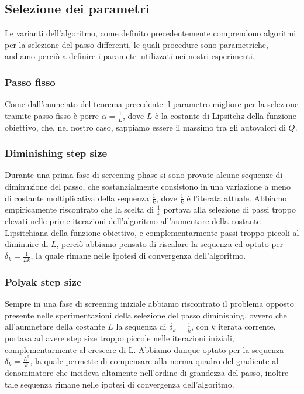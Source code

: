 \documentclass{article}
\begin{document}
\subsection{Selezione dei parametri}
Le varianti dell'algoritmo, come definito precedentemente comprendono algoritmi per la selezione del passo differenti, le quali procedure sono parametriche, andiamo perciò a definire i parametri utilizzati nei nostri esperimenti.
\subsubsection{Passo fisso}
Come dall'enunciato del teorema precedente il parametro migliore per la selezione tramite passo fisso è porre $\alpha = \frac{1}{L}$, dove $L$ è la costante di Lipsitchz della funzione obiettivo, che, nel nostro caso, sappiamo essere il massimo tra gli autovalori di $Q$.
\subsubsection{Diminishing step size}
Durante una prima fase di screening-phase si sono provate alcune sequenze di diminuzione del passo, che sostanzialmente consistono in una variazione a meno di costante moltiplicativa della sequenza $\frac{1}{k}$, dove $\frac{1}{k}$ è l'iterata attuale. Abbiamo empiricamente riscontrato che la scelta di $\frac{1}{k}$ portava alla selezione di passi troppo elevati nelle prime iterazioni dell'algoritmo all'aumentare della costante Lipsitchiana della funzione obiettivo, e complementarmente passi troppo piccoli al diminuire di $L$, perciò abbiamo pensato di riscalare la sequenza ed optato per $\delta_k = \frac{1}{Lk}$, la quale rimane nelle ipotesi di convergenza dell'algoritmo.
\subsubsection{Polyak step size}
Sempre in una fase di screening iniziale abbiamo riscontrato il problema opposto presente nelle sperimentazioni della selezione del passo diminishing, ovvero che all'aumnetare della costante $L$ la sequenza di $\delta_k = \frac{1}{k}$, con $k$ iterata corrente, portava ad avere step size troppo piccole nelle iterazioni iniziali, complementarmente al crescere di L. Abbiamo dunque optato per la sequenza $\delta_k = \frac{L^2}{k}$, la quale permette di compensare alla norma quadro del gradiente al denominatore che incideva altamente nell'ordine di grandezza del passo, inoltre tale sequenza rimane nelle ipotesi di convergenza dell'algoritmo.
\end{document}

